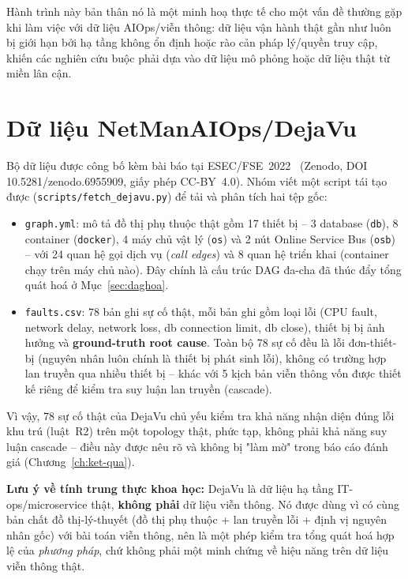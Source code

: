 \documentclass[12pt,a4paper]{report}
\newcommand{\code}[1]{\texttt{\small #1}}
\begin{document}
Hành trình này bản thân nó là một minh hoạ thực tế cho một vấn đề thường gặp khi làm việc với dữ
liệu AIOps/viễn thông: dữ liệu vận hành thật gần như luôn bị giới hạn bởi hạ tầng không ổn định
hoặc rào cản pháp lý/quyền truy cập, khiến các nghiên cứu buộc phải dựa vào dữ liệu mô phỏng hoặc
dữ liệu thật từ miền lân cận.

\section{Dữ liệu NetManAIOps/DejaVu}

Bộ dữ liệu được công bố kèm bài báo tại ESEC/FSE~2022~\cite{dejavu2022} (Zenodo, DOI
10.5281/zenodo.6955909, giấy phép CC-BY~4.0). Nhóm viết một script tái tạo được
(\code{scripts/fetch\_dejavu.py}) để tải và phân tích hai tệp gốc:

\begin{itemize}
    \item \code{graph.yml}: mô tả đồ thị phụ thuộc thật gồm 17 thiết bị -- 3 database (\code{db}),
    8 container (\code{docker}), 4 máy chủ vật lý (\code{os}) và 2 nút Online Service Bus
    (\code{osb}) -- với 24 quan hệ gọi dịch vụ (\emph{call edges}) và 8 quan hệ triển khai
    (container chạy trên máy chủ nào). Đây chính là cấu trúc DAG đa-cha đã thúc đẩy tổng quát hoá
    ở Mục~\ref{sec:daghoa}.
    \item \code{faults.csv}: 78 bản ghi sự cố thật, mỗi bản ghi gồm loại lỗi (CPU fault, network
    delay, network loss, db connection limit, db close), thiết bị bị ảnh hưởng và
    \textbf{ground-truth root cause}. Toàn bộ 78 sự cố đều là lỗi đơn-thiết-bị (nguyên nhân luôn
    chính là thiết bị phát sinh lỗi), không có trường hợp lan truyền qua nhiều thiết bị -- khác
    với 5 kịch bản viễn thông vốn được thiết kế riêng để kiểm tra suy luận lan truyền (cascade).
\end{itemize}

Vì vậy, 78 sự cố thật của DejaVu chủ yếu kiểm tra khả năng nhận diện đúng lỗi khu trú
(luật~R2) trên một topology thật, phức tạp, không phải khả năng suy luận cascade -- điều này được
nêu rõ và không bị "làm mờ" trong báo cáo đánh giá (Chương~\ref{ch:ket-qua}).

\textbf{Lưu ý về tính trung thực khoa học:} DejaVu là dữ liệu hạ tầng IT-ops/microservice thật,
\textbf{không phải} dữ liệu viễn thông. Nó được dùng vì có cùng bản chất đồ thị-lý-thuyết (đồ thị
phụ thuộc + lan truyền lỗi + định vị nguyên nhân gốc) với bài toán viễn thông, nên là một phép kiểm
tra tổng quát hoá hợp lệ của \emph{phương pháp}, chứ không phải một minh chứng về hiệu năng trên dữ
liệu viễn thông thật.
\end{document}
